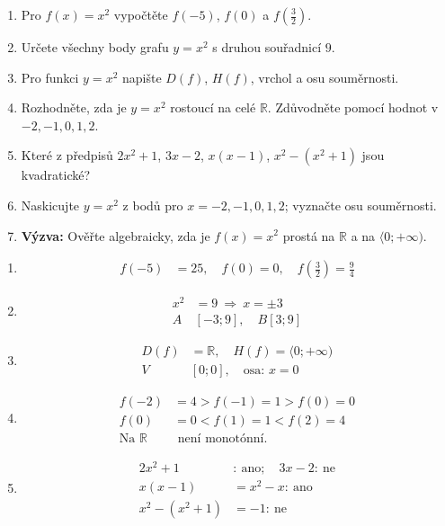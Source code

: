 \documentclass[11pt,a4paper]{article}
\begin{document}
\begin{zadaniReseniBox}[title={Domácí úkol}]
\begin{enumerate}[label=\alph*),itemsep=3pt]
\item Pro $f(x)=x^2$ vypočtěte $f(-5)$, $f(0)$ a $f(\tfrac32)$.
\item Určete všechny body grafu $y=x^2$ s druhou souřadnicí $9$.
\item Pro funkci $y=x^2$ napište $D(f)$, $H(f)$, vrchol a osu souměrnosti.
\item Rozhodněte, zda je $y=x^2$ rostoucí na celé $\mathbb R$. Zdůvodněte pomocí hodnot v $-2,-1,0,1,2$.
\item Které z předpisů $2x^2+1$, $3x-2$, $x(x-1)$, $x^2-(x^2+1)$ jsou kvadratické?
\item Naskicujte $y=x^2$ z bodů pro $x=-2,-1,0,1,2$; vyznačte osu souměrnosti.
\item \textbf{Výzva:} Ověřte algebraicky, zda je $f(x)=x^2$ prostá na $\mathbb R$ a na $\langle0;+\infty)$.
\end{enumerate}
\tcblower
\begin{enumerate}[label=\alph*),itemsep=4pt]
\item
\[
\begin{aligned}
f(-5)&=25,\quad f(0)=0,\quad f(\tfrac32)=\tfrac94
\end{aligned}
\]

\item
\[
\begin{aligned}
x^2&=9\ \Rightarrow\ x=\pm3 \\
A&[-3;9],\quad B[3;9]
\end{aligned}
\]

\item
\[
\begin{aligned}
D(f)&=\mathbb R,\quad H(f)=\langle0;+\infty) \\
V&[0;0],\quad \text{osa: }x=0
\end{aligned}
\]

\item
\[
\begin{aligned}
f(-2)&=4>f(-1)=1>f(0)=0 \\
f(0)&=0<f(1)=1<f(2)=4 \\
\text{Na }\mathbb R&\text{ není monotónní.}
\end{aligned}
\]

\item
\[
\begin{aligned}
2x^2+1&:\ \text{ano};\quad 3x-2:\ \text{ne} \\
x(x-1)&=x^2-x:\ \text{ano} \\
x^2-(x^2+1)&=-1:\ \text{ne}
\end{aligned}
\]


\end{enumerate}
\end{zadaniReseniBox}
\end{document}
